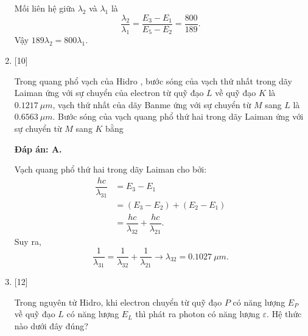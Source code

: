 \begin{enumerate}[label=\bfseries Câu \arabic*:]
{Mối liên hệ giữa $ \lambda_{2} $ và $ \lambda_{1} $ là
$$
	\dfrac{\lambda_{2}}{\lambda_{1}} = \dfrac{E_{3} - E_{1}}{E_{5} - E_{2}} = \dfrac{800}{189}.
$$
Vậy $ 189 \lambda_{2} = 800 \lambda_{1} $.
		}

		\item {}
	
		\cauhoi
		{Trong quang phổ vạch của Hidro , bước sóng của vạch thứ nhất trong dãy Laiman ứng với sự chuyển của electron từ quỹ đạo $ L $ về quỹ đạo $ K $ là $ \SI{0,1217}{\mu m} $, vạch thứ nhất của dãy Banme ứng với sự chuyển từ $ M $ sang $ L $  là $ \SI{0,6563}{\mu m} $. Bước sóng của vạch quang phổ thứ hai trong dãy Laiman ứng với sự chuyển từ $ M $ sang $ K $ bằng 
		}
	
		\loigiai
		{		\textbf{Đáp án: A.}

Vạch quang phổ thứ hai trong dãy Laiman cho bởi:
	\begin{align*}
		\dfrac{hc}{\lambda_{31}} &= E_{3} - E_{1} \\ 
		&= \left( E_{3} - E_{2} \right) + \left( E_{2} - E_{1} \right) \\
		&= \dfrac{hc}{\lambda_{32}} + \dfrac{hc}{\lambda_{21}}.
	\end{align*}
Suy ra,
	\begin{equation*}
		\dfrac{1}{\lambda_{31}} = \dfrac{1}{\lambda_{32}} + \dfrac{1}{\lambda_{21}} \rightarrow \lambda_{32} = \SI{0,1027}{\mu m}.  
	\end{equation*}
		}
		
		\item {}
	
		\cauhoi
		{Trong nguyên tử Hidro, khi electron chuyển từ quỹ đạo $ P $ có năng lượng $ E_{P} $ về quỹ đạo $ L $ có năng lượng $ E_{L} $ thì phát ra photon có năng lượng $ \varepsilon $. Hệ thức nào dưới đây đúng?
		}
	

\end{enumerate}
